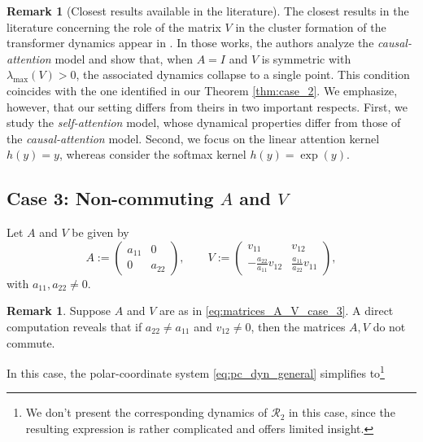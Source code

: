 \documentclass[10pt]{article}
\theoremstyle{definition}
\theoremstyle{definition}
\newtheorem{remark}[theorem]{Remark}
\numberwithin{equation}{section}
\newcommand{\CR}{\mathcal{R}}
\newcommand{\lambdaMax}{\lambda_{\mathrm{max}}}
\begin{document}
\begin{remark}[Closest results available in the literature]
The closest results in the literature concerning the role of the matrix $V$ in the cluster formation of the transformer dynamics appear in \cite{abella2024asymptotic,abella2025consensus}.
In those works, the authors analyze the \emph{causal-attention} model and show that, when $A = I$ and $V$ is symmetric with $\lambdaMax(V) > 0$, the associated dynamics collapse to a single point.
This condition coincides with the one identified in our Theorem \ref{thm:case_2}. We emphasize, however, that our setting differs from theirs in two important respects.
First, we study the \emph{self-attention} model, whose dynamical properties differ from those of the \emph{causal-attention} model.
Second, we focus on the linear attention kernel $h(y)= y$, whereas \cite{abella2024asymptotic,abella2025consensus} consider the softmax kernel $h(y) = \exp(y)$.
\end{remark}

\subsection{Case 3: Non-commuting \texorpdfstring{$A$}{A} and \texorpdfstring{$V$}{V}}
\label{sec:th_case3}

Let $A$ and $V$ be given by
\begin{equation}\label{eq:matrices_A_V_case_3}
A := \left(\begin{array}{ll}
    a_{11} & 0 \\
    0 & a_{22}
\end{array} \right), \qquad  V := \left( \begin{array}{cc}
    v_{11} & v_{12}  \\[4pt]
    -\frac{a_{22}}{a_{11}} v_{12} & \frac{a_{11}}{a_{22}} v_{11} 
\end{array} \right),
\end{equation}
with $a_{11}, a_{22} \neq 0$. 

\begin{remark}
Suppose $A$ and $V$ are as in \eqref{eq:matrices_A_V_case_3}. A direct computation reveals that if $a_{22} \not = a_{11} $ and $v_{12} \not =0$, then the matrices $A, V$ do not commute. 
\end{remark}

In this case, the polar-coordinate system \eqref{eq:pc_dyn_general} simplifies to\footnote{We don't present the corresponding dynamics of $\CR_2$ in this case, since the resulting expression is rather complicated and offers limited insight.}
\end{document}
